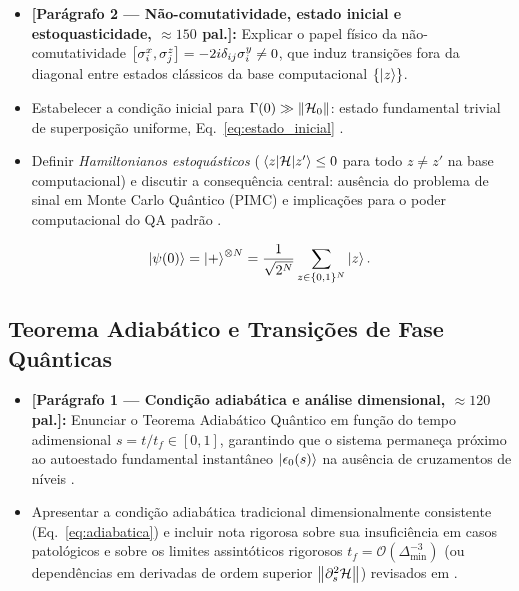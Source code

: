 \documentclass[aps,pre,twocolumn,10pt,superscriptaddress,nofootinbib]{revtex4-2}
\begin{document}
\begin{itemize}
  \item \textbf{[Parágrafo 2 --- Não-comutatividade, estado inicial e estoquasticidade, $\approx 150$ pal.]:}
        Explicar o papel físico da não-comutatividade $\comm{\sigma_i^x}{\sigma_j^z} = -2i\delta_{ij}\sigma_i^y \neq 0$, que induz transições fora da diagonal entre estados clássicos da base computacional $\{\ket{z}\}$.
  \item Estabelecer a condição inicial para $\Gamma(0) \gg \norm{\mathcal{H}_0}$: estado fundamental trivial de superposição uniforme, Eq.~\eqref{eq:estado_inicial} \cite{Kadowaki1998,Albash2018}.
  \item Definir \emph{Hamiltonianos estoquásticos} ($\mel{z}{\mathcal{H}}{z'} \le 0$ para todo $z \neq z'$ na base computacional) e discutir a consequência central: ausência do problema de sinal em Monte Carlo Quântico (PIMC) e implicações para o poder computacional do QA padrão \cite{Albash2018}.
\end{itemize}

\begin{equation}
  \ket{\psi(0)} = \ket{+}^{\otimes N} = \frac{1}{\sqrt{2^N}} \sum_{z \in \{0,1\}^N} \ket{z}.
  \label{eq:estado_inicial}
\end{equation}

\subsection{Teorema Adiabático e Transições de Fase Quânticas}
\label{subsec:adiabatico_qpt}

\begin{itemize}
  \item \textbf{[Parágrafo 1 --- Condição adiabática e análise dimensional, $\approx 120$ pal.]:}
        Enunciar o Teorema Adiabático Quântico em função do tempo adimensional $s = t/t_f \in [0,1]$, garantindo que o sistema permaneça próximo ao autoestado fundamental instantâneo $\ket{\epsilon_0(s)}$ na ausência de cruzamentos de níveis \cite{Das2008,Albash2018}.
  \item Apresentar a condição adiabática tradicional dimensionalmente consistente (Eq.~\eqref{eq:adiabatica}) e incluir nota rigorosa sobre sua insuficiência em casos patológicos e sobre os limites assintóticos rigorosos $t_f = \mathcal{O}(\Delta_{\min}^{-3})$ (ou dependências em derivadas de ordem superior $\norm{\partial_s^2 \mathcal{H}}$) revisados em \cite{Albash2018}.
\end{itemize}
\end{document}
